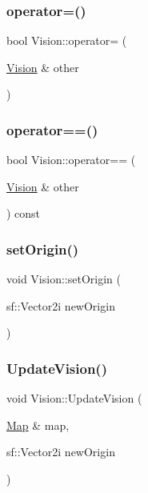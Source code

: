 \mbox{\label{class_vision_a6e33c5769f73c0aa0d5cad335ddb4605}} 
\subsubsection{\texorpdfstring{operator=()}{operator=()}}
{\footnotesize\ttfamily bool Vision\+::operator= (\begin{DoxyParamCaption}\item[{\mbox{\hyperlink{class_vision}{Vision}} \&}]{other }\end{DoxyParamCaption})}

\mbox{\label{class_vision_a3d94cafed8244721a8bf62af5fe07bc0}} 
\subsubsection{\texorpdfstring{operator==()}{operator==()}}
{\footnotesize\ttfamily bool Vision\+::operator== (\begin{DoxyParamCaption}\item[{\mbox{\hyperlink{class_vision}{Vision}} \&}]{other }\end{DoxyParamCaption}) const}

\mbox{\label{class_vision_a5f26ef8f946b7cf29e533797bf474954}} 
\subsubsection{\texorpdfstring{set\+Origin()}{setOrigin()}}
{\footnotesize\ttfamily void Vision\+::set\+Origin (\begin{DoxyParamCaption}\item[{sf\+::\+Vector2i}]{new\+Origin }\end{DoxyParamCaption})}

\mbox{\label{class_vision_a626452b58aa651ff91e4e60a74ce7443}} 
\subsubsection{\texorpdfstring{Update\+Vision()}{UpdateVision()}}
{\footnotesize\ttfamily void Vision\+::\+Update\+Vision (\begin{DoxyParamCaption}\item[{\mbox{\hyperlink{class_map}{Map}} \&}]{map,  }\item[{sf\+::\+Vector2i}]{new\+Origin }\end{DoxyParamCaption})}

